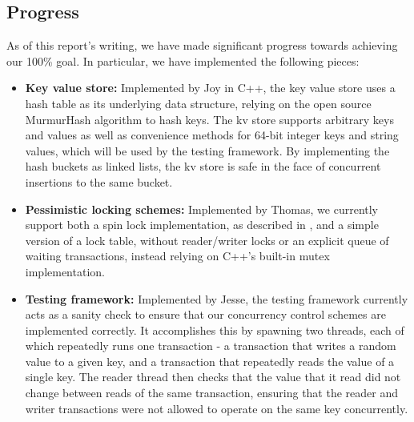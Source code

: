 \subsection{Progress}
As of this report's writing, we have made significant progress towards 
achieving our 100\% goal. In particular, we have implemented the following
pieces:
\begin{itemize}
\item \textbf{Key value store:} Implemented by Joy in C++, the key value store 
uses a hash table as its underlying data structure, relying on the open source
MurmurHash algorithm to hash keys. The kv store supports arbitrary keys and 
values as well as convenience methods for 64-bit integer keys and string 
values, which will be used by the testing framework. By implementing the hash 
buckets as linked lists, the kv store is safe in the face of concurrent 
insertions to the same bucket.
\item \textbf{Pessimistic locking schemes:} Implemented by Thomas, we currently 
support both a spin lock implementation, as described in 
, and a simple version of a lock table, without 
reader/writer locks or an explicit queue of waiting transactions, instead 
relying on C++'s built-in mutex implementation.
\item \textbf{Testing framework:} Implemented by Jesse, the testing framework 
currently acts as a sanity check to ensure that our concurrency control schemes 
are implemented correctly. It accomplishes this by spawning two threads, each 
of which repeatedly runs one transaction - a transaction that writes a random 
value to a given key, and a transaction that repeatedly reads the value of a 
single key. The reader thread then checks that the value that it read did not 
change between reads of the same transaction, ensuring that the reader and 
writer transactions were not allowed to operate on the same key concurrently.
\end{itemize}

